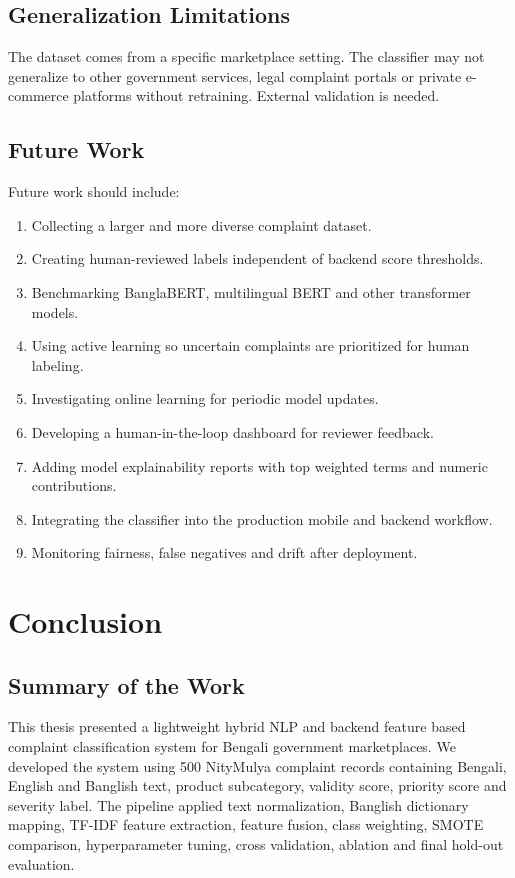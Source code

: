 \documentclass[12pt,a4paper,openany]{book}
\begin{document}
\section{Generalization Limitations}
The dataset comes from a specific marketplace setting. The classifier may not generalize to other government services, legal complaint portals or private e-commerce platforms without retraining. External validation is needed.

\section{Future Work}
Future work should include:
\begin{enumerate}
  \item Collecting a larger and more diverse complaint dataset.
  \item Creating human-reviewed labels independent of backend score thresholds.
  \item Benchmarking BanglaBERT, multilingual BERT and other transformer models.
  \item Using active learning so uncertain complaints are prioritized for human labeling.
  \item Investigating online learning for periodic model updates.
  \item Developing a human-in-the-loop dashboard for reviewer feedback.
  \item Adding model explainability reports with top weighted terms and numeric contributions.
  \item Integrating the classifier into the production mobile and backend workflow.
  \item Monitoring fairness, false negatives and drift after deployment.
\end{enumerate}

\chapter{Conclusion}

\section{Summary of the Work}
This thesis presented a lightweight hybrid NLP and backend feature based complaint classification system for Bengali government marketplaces. We developed the system using 500 NityMulya complaint records containing Bengali, English and Banglish text, product subcategory, validity score, priority score and severity label. The pipeline applied text normalization, Banglish dictionary mapping, TF-IDF feature extraction, feature fusion, class weighting, SMOTE comparison, hyperparameter tuning, cross validation, ablation and final hold-out evaluation.
\end{document}
